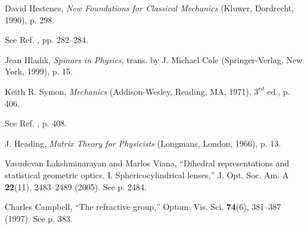\documentclass[11pt,twocolumn]{article}
\begin{document}
\begin{thebibliography}{99}
David Hestenes, \textsl{New Foundations for Classical Mechanics} (Kluwer, Dordrecht, 1990), p. 298.

See Ref. \cite{Hestenes_1990_NewFoundationsforClassicalMechanics_p298}, pp. 282--284.

Jean Hladik, \textsl{Spinors in Physics}, trans. by J. Michael Cole (Springer-Verlag, New York, 1999), p. 15.


Keith R. Symon, \textsl{Mechanics} (Addison-Wesley, Reading, MA, 1971), $3^{rd}$ ed., p. 406.

See Ref. \cite{Symon_1971_Mechanics_p406}, p. 408.

J. Heading, \textsl{Matrix Theory for Physicists} (Longmans, London, 1966), p. 13.

Vasudevan Lakshminarayan and Marlos Viana, ``Dihedral representations and statistical geometric optics. I. Sphericocylindrical lenses,'' J. Opt. Soc. Am. A \textbf{22}(11), 2483--2489 (2005).  See p. 2484.

Charles Campbell, ``The refractive group,'' Optom. Vis. Sci. \textbf{74}(6), 381--387 (1997).  See p. 383.


\end{thebibliography}
\end{document}
